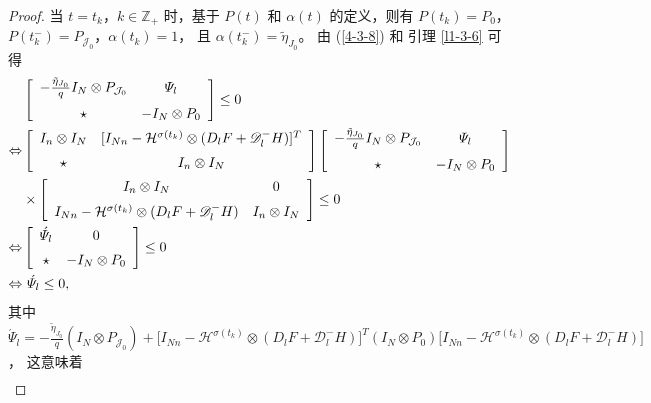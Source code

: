 \begin{proof}
    当 $ t=t_k$，$k\in\mathbb{Z}_+ $ 时，基于 $P(t)$ 和 $\alpha(t)$ 的定义，则有 
    $P(t_k)=P_0$，$P(t^-_k)=P_{\mathcal{J}_0}$，$ \alpha(t_k)=1$， 且 $\alpha(t^-_k)=\tilde{\eta}_{J_0}$。 由 (\ref{4-3-8}) 和 引理 \ref{l1-3-6} 可得  
    \begin{align*} 
    &\left[ \begin{array}{cc}
    -\frac{\tilde{\eta}_{J_0}}{q}I_N\otimes P_{\mathcal{J}_0}& \varPsi_{l}\vspace{0.2cm}\\
    \star&-I_N\otimes P_0
    \end{array}
    \right]\leq0 \\
    \Leftrightarrow& \left[ \begin{array}{cc}
    I_n\otimes I_N& [I_{Nn}- \mathcal{H}^{\sigma(t_k)} \otimes (D_{l}F+\mathscr{D}_{l}^-H)]^T\vspace{0.2cm}\\
    \star&I_n\otimes I_N
    \end{array}\right]\left[ \begin{array}{cc}
    -\frac{\tilde{\eta}_{J_0}}{q}I_N\otimes P_{\mathcal{J}_0}& \varPsi_{l}\vspace{0.2cm}\\
    \star&-I_N\otimes P_0
    \end{array}
    \right]\\
    &\times\left[ \begin{array}{cc}
    I_n\otimes I_N& 0\vspace{0.2cm}\\
    I_{Nn}- \mathcal{H}^{\sigma(t_k)} \otimes (D_{l}F+\mathscr{D}_{l}^-H)&I_n\otimes I_N
    \end{array}\right]\leq0\\ 
    \Leftrightarrow& \left[ \begin{array}{cc}
    \acute{\varPsi}_{l}& 0\vspace{0.2cm}\\
    \star&-I_N\otimes P_0
    \end{array}\right]\leq0\\ 
    \Leftrightarrow& 
    \ \acute{\varPsi}_{l}
    \leq 0, 
    \end{align*}
    其中 $\acute{\varPsi}_{l}= -\frac{\tilde{\eta}_{J_0}}{q}(I_N\otimes P_{\mathcal{J}_0})+[I_{Nn}- \mathcal{H}^{\sigma(t_k)} \otimes (D_{l}F+\mathscr{D}_{l}^-H)\big]^T(I_N\otimes P_0)[I_{Nn}- \mathcal{H}^{\sigma(t_k)} \otimes (D_{l}F+\mathscr{D}_{l}^-H)\big]$， 这意味着
    \begin{align}\label{4-3-13}

\end{align}
\end{proof}
